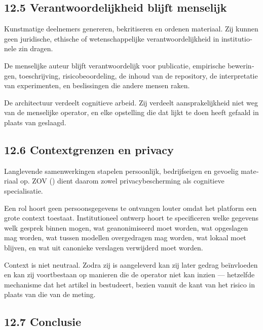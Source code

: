 \begin{dutch}
\subsection*{12.5 Verantwoordelijkheid blijft menselijk}
\label{sec:nl:12.5}

Kunstmatige deelnemers genereren, bekritiseren en ordenen materiaal. Zij kunnen geen juridische, ethische of wetenschappelijke verantwoordelijkheid in institutionele zin dragen.

De menselijke auteur blijft verantwoordelijk voor publicatie, empirische beweringen, toeschrijving, risicobeoordeling, de inhoud van de repository, de interpretatie van experimenten, en beslissingen die andere mensen raken.

De architectuur verdeelt cognitieve arbeid. Zij verdeelt aansprakelijkheid niet weg van de menselijke operator, en elke opstelling die dat lijkt te doen heeft gefaald in plaats van geslaagd.


\subsection*{12.6 Contextgrenzen en privacy}
\label{sec:nl:12.6}

Langlevende samenwerkingen stapelen persoonlijk, bedrijfseigen en gevoelig materiaal op. ZOV () dient daarom zowel privacybescherming als cognitieve specialisatie.

Een rol hoort geen persoonsgegevens te ontvangen louter omdat het platform een grote context toestaat. Institutioneel ontwerp hoort te specificeren welke gegevens welk gesprek binnen mogen, wat geanonimiseerd moet worden, wat opgeslagen mag worden, wat tussen modellen overgedragen mag worden, wat lokaal moet blijven, en wat uit canonieke verslagen verwijderd moet worden.

Context is niet neutraal. Zodra zij is aangeleverd kan zij later gedrag beïnvloeden en kan zij voortbestaan op manieren die de operator niet kan inzien — hetzelfde mechanisme dat het artikel in  bestudeert, bezien vanuit de kant van het risico in plaats van die van de meting.


\subsection*{12.7 Conclusie}
\label{sec:nl:12.7}


\end{dutch}
